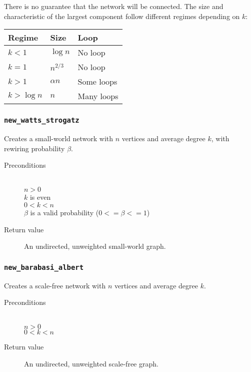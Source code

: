 There is no guarantee that the network will be connected. The size and 
characteristic of the largest component follow different regimes 
depending on $k$:

\begin{table*}[!hb]
 \centering
 \begin{tabular}{lll}
  \hline
  Regime       & Size       & Loop \\ \hline
  $k < 1$      & $\log n$   & No loop\\
  $k = 1$      & $n^{2/3}$  & No loop\\
  $k > 1$      & $\alpha n$ & Some loops\\
  $k > \log n$ & $n$        & Many loops \\\hline
 \end{tabular}
\end{table*}

\subsubsection{\texttt{new\_watts\_strogatz}}

Creates a small-world network with $n$ vertices and average degree $k$,
with rewiring probability $\beta$.

\begin{description}
 \item[Preconditions] ~\\
   $n > 0$ \\
   $k$ is even\\
   $0 < k < n$\\
   $\beta$ is a valid probability ($0 <= \beta <= 1$)
 \item[Return value] An undirected, unweighted small-world graph.
\end{description}

\subsubsection{\texttt{new\_barabasi\_albert}}

Creates a scale-free network with $n$ vertices and average degree $k$.

\begin{description}
 \item[Preconditions] ~\\
   $n > 0$ \\
   $0 < k < n$
 \item[Return value] An undirected, unweighted scale-free graph.
\end{description}
